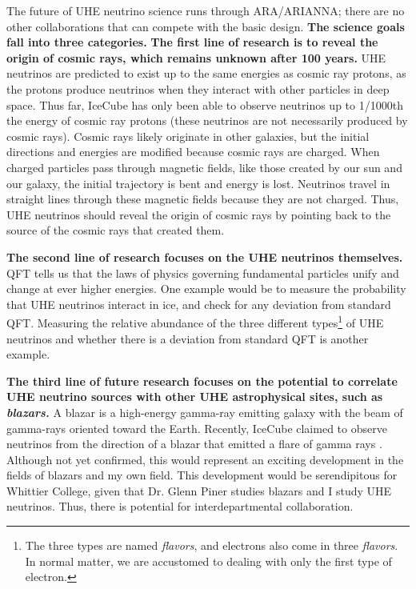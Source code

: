 \documentclass[../../main.tex]{subfiles}
\begin{document}
The future of UHE neutrino science runs through ARA/ARIANNA; there are no other collaborations that can compete with the basic design.  \textbf{The science goals fall into three categories.}  \textbf{The first line of research is to reveal the origin of cosmic rays, which remains unknown after 100 years.}  UHE neutrinos are predicted to exist up to the same energies as cosmic ray protons, as the protons produce neutrinos when they interact with other particles in deep space.  Thus far, IceCube has only been able to observe neutrinos up to 1/1000th the energy of cosmic ray protons (these neutrinos are not necessarily produced by cosmic rays).  Cosmic rays likely originate in other galaxies, but the initial directions and energies are modified because cosmic rays are charged.  When charged particles pass through magnetic fields, like those created by our sun and our galaxy, the initial trajectory is bent and energy is lost.  Neutrinos travel in straight lines through these magnetic fields because they are not charged.  Thus, UHE neutrinos should reveal the origin of cosmic rays by pointing back to the source of the cosmic rays that created them. \\ \hspace{0.1cm}

\textbf{The second line of research focuses on the UHE neutrinos themselves.}  QFT tells us that the laws of physics governing fundamental particles unify and change at ever higher energies.  One example would be to measure the probability that UHE neutrinos interact in ice, and check for any deviation from standard QFT.  Measuring the relative abundance of the three different types\footnote{The three types are named \textit{flavors}, and electrons also come in three \textit{flavors}.  In normal matter, we are accustomed to dealing with only the first type of electron.} of UHE neutrinos and whether there is a deviation from standard QFT is another example.  \\ \hspace{0.1cm}

\textbf{The third line of future research focuses on the potential to correlate UHE neutrino sources with other UHE astrophysical sites, such as \textit{blazars.}}  A blazar is a high-energy gamma-ray emitting galaxy with the beam of gamma-rays oriented toward the Earth.  Recently, IceCube claimed to observe neutrinos from the direction of a blazar that emitted a flare of gamma rays \cite{eaat2890}.  Although not yet confirmed, this would represent an exciting development in the fields of blazars and my own field.  This development would be serendipitous for Whittier College, given that Dr. Glenn Piner studies blazars and I study UHE neutrinos. Thus, there is potential for interdepartmental collaboration. \\ \hspace{0.1cm}
\end{document}
